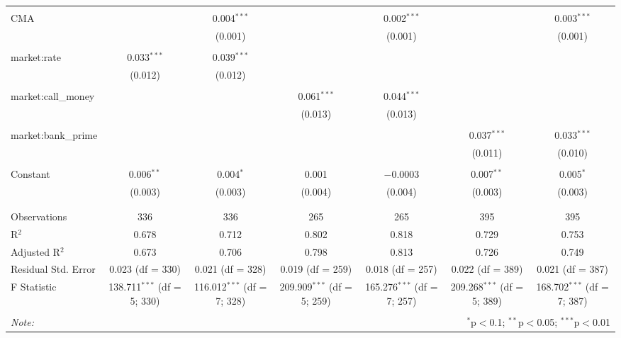 \begin{table}[!htbp]
\begin{tabular}{@{\extracolsep{5pt}}lcccccc}
  & & & & & & \\ 
 CMA &  & 0.004$^{***}$ &  & 0.002$^{***}$ &  & 0.003$^{***}$ \\ 
  &  & (0.001) &  & (0.001) &  & (0.001) \\ 
  & & & & & & \\ 
 market:rate & 0.033$^{***}$ & 0.039$^{***}$ &  &  &  &  \\ 
  & (0.012) & (0.012) &  &  &  &  \\ 
  & & & & & & \\ 
 market:call\_money &  &  & 0.061$^{***}$ & 0.044$^{***}$ &  &  \\ 
  &  &  & (0.013) & (0.013) &  &  \\ 
  & & & & & & \\ 
 market:bank\_prime &  &  &  &  & 0.037$^{***}$ & 0.033$^{***}$ \\ 
  &  &  &  &  & (0.011) & (0.010) \\ 
  & & & & & & \\ 
 Constant & 0.006$^{**}$ & 0.004$^{*}$ & 0.001 & $-$0.0003 & 0.007$^{**}$ & 0.005$^{*}$ \\ 
  & (0.003) & (0.003) & (0.004) & (0.004) & (0.003) & (0.003) \\ 
  & & & & & & \\ 
\hline \\[-1.8ex] 
Observations & 336 & 336 & 265 & 265 & 395 & 395 \\ 
R$^{2}$ & 0.678 & 0.712 & 0.802 & 0.818 & 0.729 & 0.753 \\ 
Adjusted R$^{2}$ & 0.673 & 0.706 & 0.798 & 0.813 & 0.726 & 0.749 \\ 
Residual Std. Error & 0.023 (df = 330) & 0.021 (df = 328) & 0.019 (df = 259) & 0.018 (df = 257) & 0.022 (df = 389) & 0.021 (df = 387) \\ 
F Statistic & 138.711$^{***}$ (df = 5; 330) & 116.012$^{***}$ (df = 7; 328) & 209.909$^{***}$ (df = 5; 259) & 165.276$^{***}$ (df = 7; 257) & 209.268$^{***}$ (df = 5; 389) & 168.702$^{***}$ (df = 7; 387) \\ 
\hline 
\hline \\[-1.8ex] 
\textit{Note:}  & \multicolumn{6}{r}{$^{*}$p$<$0.1; $^{**}$p$<$0.05; $^{***}$p$<$0.01} \\ 
\end{tabular} 
\end{table} 
